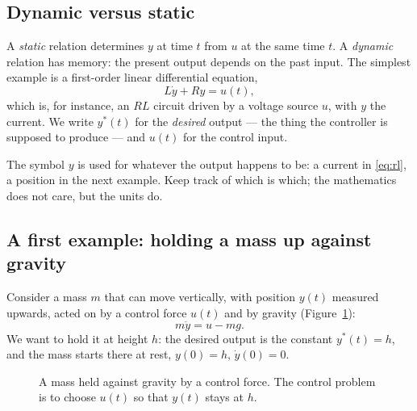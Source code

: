 \documentclass[11pt]{article}
\begin{document}
\subsection{Dynamic versus static} A \emph{static} relation determines $y$ at time
$t$ from $u$ at the same time $t$. A \emph{dynamic} relation has memory: the
present output depends on the past input. The simplest example is a first-order
linear differential equation,
\begin{equation}\label{eq:rl}
   L\dot y + Ry = u(t),
\end{equation}
which is, for instance, an $RL$ circuit driven by a voltage source $u$, with $y$
the current. We write $y^{*}(t)$ for the \emph{desired} output --- the thing the
controller is supposed to produce --- and $u(t)$ for the control input.

\begin{note}
The symbol $y$ is used for whatever the output happens to be: a current in
\eqref{eq:rl}, a position in the next example. Keep track of which is which; the
mathematics does not care, but the units do.
\end{note}

\subsection{A first example: holding a mass up against gravity}
Consider a mass $m$ that can move vertically, with position $y(t)$ measured
upwards, acted on by a control force $u(t)$ and by gravity
(Figure~\ref{fig:mass}):
\begin{equation}\label{eq:mass}
   m\ddot y = u - mg .
\end{equation}
We want to hold it at height $h$: the desired output is the constant
$y^{*}(t)=h$, and the mass starts there at rest,
$y(0)=h$, $\dot y(0)=0$.

\begin{figure}[htb]
\centering
{}
\caption{A mass held against gravity by a control force. The control problem is
to choose $u(t)$ so that $y(t)$ stays at $h$.}
\label{fig:mass}
\end{figure}
\end{document}
